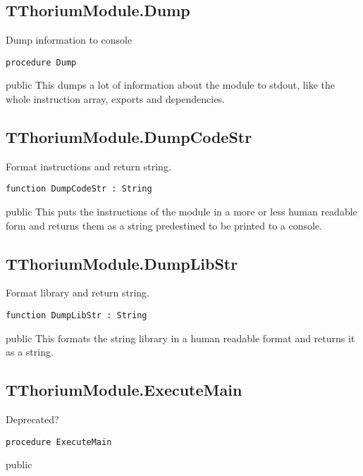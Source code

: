 \subsection{TThoriumModule.Dump}
\label{thoriumcorepkg:thorium:tthoriummodule:dump}
\begin{FPCList}
\Synopsis
Dump information to console\Declaration 

\begin{verbatim}
procedure Dump
\end{verbatim}
\Visibility
public
\Description
This dumps a lot of information about the module to stdout, like the whole instruction array, exports and dependencies.\end{FPCList}
\subsection{TThoriumModule.DumpCodeStr}
\label{thoriumcorepkg:thorium:tthoriummodule:dumpcodestr}
\begin{FPCList}
\Synopsis
Format instructions and return string.\Declaration 

\begin{verbatim}
function DumpCodeStr : String
\end{verbatim}
\Visibility
public
\Description
This puts the instructions of the module in a more or less human readable form and returns them as a string predestined to be printed to a console.\end{FPCList}
\subsection{TThoriumModule.DumpLibStr}
\label{thoriumcorepkg:thorium:tthoriummodule:dumplibstr}
\begin{FPCList}
\Synopsis
Format library and return string.\Declaration 

\begin{verbatim}
function DumpLibStr : String
\end{verbatim}
\Visibility
public
\Description
This formats the string library in a human readable format and returns it as a string.\end{FPCList}
\subsection{TThoriumModule.ExecuteMain}
\label{thoriumcorepkg:thorium:tthoriummodule:executemain}
\begin{FPCList}
\Synopsis
Deprecated?\Declaration 

\begin{verbatim}
procedure ExecuteMain
\end{verbatim}
\Visibility
public
\end{FPCList}
